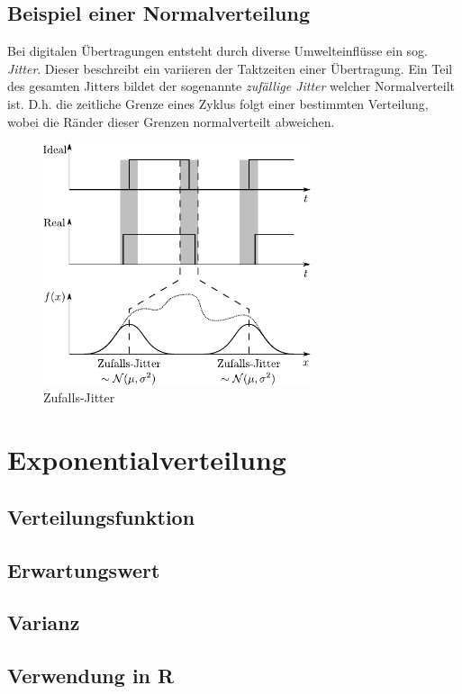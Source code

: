 \clearpage

\subsection{Beispiel einer Normalverteilung}
Bei digitalen Übertragungen entsteht durch diverse Umwelteinflüsse 
ein sog. \emph{Jitter}. Dieser beschreibt ein variieren der 
Taktzeiten einer Übertragung. Ein Teil des gesamten Jitters bildet 
der sogenannte \emph{zufällige Jitter} welcher Normalverteilt ist.
D.h. die zeitliche Grenze eines Zyklus folgt einer bestimmten
Verteilung, wobei die Ränder dieser Grenzen normalverteilt abweichen.

\begin{figure}[h!]
	\centering
	\includegraphics[width=0.7\textwidth]{jitter.pdf}
	\caption{Zufalls-Jitter}
	\label{fig:jitter}
\end{figure}

\newpage
\section{Exponentialverteilung}
\subsection{Verteilungsfunktion}
\subsection{Erwartungswert}
\subsection{Varianz}
\subsection{Verwendung in R}
